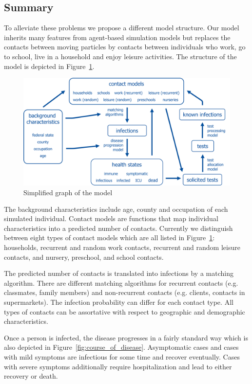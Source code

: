 \subsection{Summary}
\label{sub:model_summary}

To alleviate these problems we propose a different model structure. Our model inherits many features from agent-based simulation models but replaces the contacts between moving particles by contacts between individuals who work, go to school, live in a household and enjoy leisure activities. The structure of the model is depicted in Figure~\ref{fig:model_graph}.

\begin{figure}[!tp]
    \centering
    \includegraphics[width=\textwidth]{../figures/model_detailed.png}
    \caption{Simplified graph of the model}
    \label{fig:model_graph}
\end{figure}

The background characteristics include age, county and occupation of each simulated individual. Contact models are functions that map individual characteristics into a predicted number of contacts. Currently we distinguish between eight types of contact models which are all listed in Figure~\ref{fig:model_graph}: households, recurrent and random work contacts, recurrent and random leisure contacts, and nursery, preschool, and school contacts.

The predicted number of contacts is translated into infections by a matching algorithm. There are different matching algorithms for recurrent contacts (e.g. classmates, family members) and non-recurrent contacts (e.g. clients, contacts in supermarkets). The infection probability can differ for each contact type. All types of contacts can be assortative with respect to geographic and demographic characteristics.

Once a person is infected, the disease progresses in a fairly standard way which is also depicted in Figure~\ref{fig:course_of_disease}. Asymptomatic cases and cases with mild symptoms are infectious for some time and recover eventually. Cases with severe symptoms additionally require hospitalization and lead to either recovery or death.

